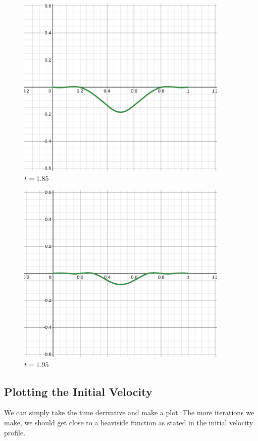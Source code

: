 \documentclass[letter]{article}
\begin{document}
\begin{minipage}{0.5\textwidth}
\begin{figure}[H]
	\centering
	\includegraphics[width=0.9\textwidth]{ss/dx3.png}
	\caption{$t = 1.85$}
	\label{fig:ss-c_n_01-png}
\end{figure}
\begin{figure}[H]
	\centering
	\includegraphics[width=0.9\textwidth]{ss/dx4.png}
	\caption{$t = 1.95$}
	\label{fig:ss-c_n_01-png}
\end{figure}
\end{minipage}
\newpage

\subsection*{Plotting the Initial Velocity}
We can simply take the time derivative and make a plot. The more iterations we make, we should get close to a heaviside function as stated in the initial velocity profile. 
\end{document}
